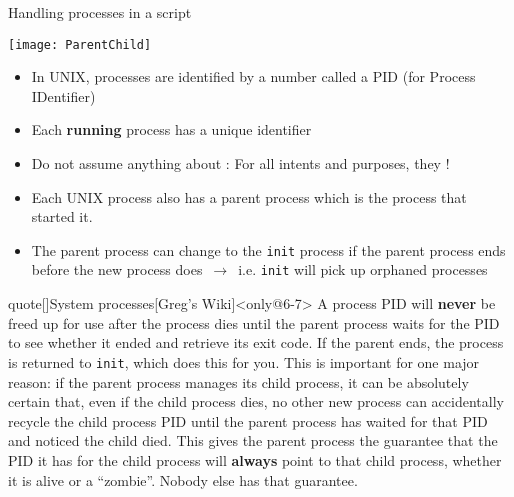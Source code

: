 \begin{frame}{Handling processes in a script}
\begin{overlayarea}{\textwidth}{0.7\textheight}
\begin{onlyenv}
\begin{itemize}
                         \centerline{\texttt{[image: ParentChild]}}
            \end{itemize}
        \end{onlyenv}
        \begin{itemize}[<only@5->]
            \item In UNIX, processes are identified by a number called a PID (for Process IDentifier)
            \item Each \textbf{running} process has a unique identifier
            \item Do not assume anything about : For all intents and purposes, they !
            \item Each UNIX process also has a parent process which is the process that started it.
            \item The parent process can change to the \texttt{init} process if the parent process ends before the new process does \,$\to$\, i.e. \texttt{init} will pick up orphaned processes
        \end{itemize}
        \vspace{-3mm}
        \begin{varblock}{quote}[\textwidth]{System processes}[Greg's Wiki]<only@6-7>
            A process PID will \textbf{never} be freed up for use after the process dies until the parent process waits for the PID to see whether it ended and retrieve its exit code.
            If the parent ends, the process is returned to \textnormal{\texttt{init}}, which does this for you.
            This is important for one major reason: \alert{if the parent process manages its child process, it can be absolutely certain that, even if the child process dies, no other new process can accidentally recycle the child process PID until the parent process has waited for that PID and noticed the child died}.
            This gives the parent process the guarantee that the PID it has for the child process will \textbf{always} point to that child process, whether it is alive or a ``zombie''.
            Nobody else has that guarantee.
        \end{varblock}

\end{overlayarea}
\end{frame}
